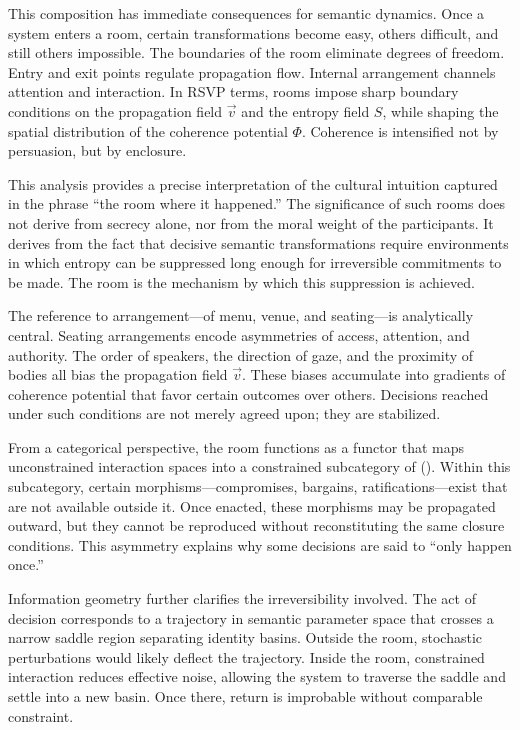 \documentclass[11pt,oneside]{article}
\begin{document}
This composition has immediate consequences for semantic dynamics. Once a system enters a room, certain transformations become easy, others difficult, and still others impossible. The boundaries of the room eliminate degrees of freedom. Entry and exit points regulate propagation flow. Internal arrangement channels attention and interaction. In RSVP terms, rooms impose sharp boundary conditions on the propagation field $\vec v$ and the entropy field $S$, while shaping the spatial distribution of the coherence potential $\Phi$. Coherence is intensified not by persuasion, but by enclosure.

This analysis provides a precise interpretation of the cultural intuition captured in the phrase ``the room where it happened.'' The significance of such rooms does not derive from secrecy alone, nor from the moral weight of the participants. It derives from the fact that decisive semantic transformations require environments in which entropy can be suppressed long enough for irreversible commitments to be made. The room is the mechanism by which this suppression is achieved.

The reference to arrangement—of menu, venue, and seating—is analytically central. Seating arrangements encode asymmetries of access, attention, and authority. The order of speakers, the direction of gaze, and the proximity of bodies all bias the propagation field $\vec v$. These biases accumulate into gradients of coherence potential that favor certain outcomes over others. Decisions reached under such conditions are not merely agreed upon; they are stabilized.

From a categorical perspective, the room functions as a functor that maps unconstrained interaction spaces into a constrained subcategory of (). Within this subcategory, certain morphisms—compromises, bargains, ratifications—exist that are not available outside it. Once enacted, these morphisms may be propagated outward, but they cannot be reproduced without reconstituting the same closure conditions. This asymmetry explains why some decisions are said to “only happen once.”

Information geometry further clarifies the irreversibility involved. The act of decision corresponds to a trajectory in semantic parameter space that crosses a narrow saddle region separating identity basins. Outside the room, stochastic perturbations would likely deflect the trajectory. Inside the room, constrained interaction reduces effective noise, allowing the system to traverse the saddle and settle into a new basin. Once there, return is improbable without comparable constraint.
\end{document}
